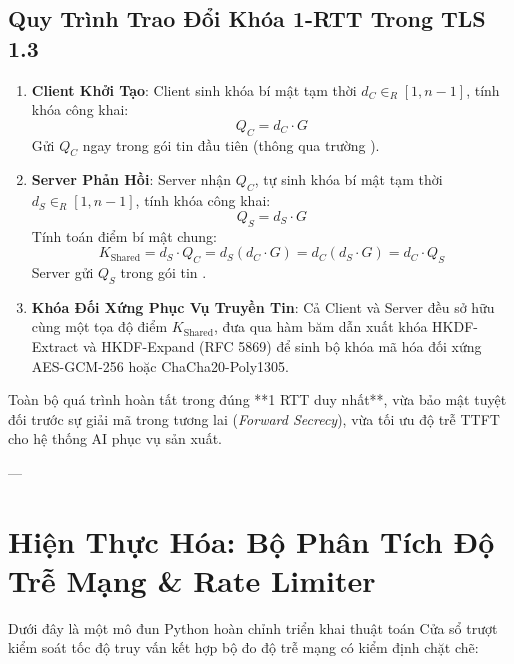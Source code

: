\subsection{Quy Trình Trao Đổi Khóa 1-RTT Trong TLS 1.3}

\begin{enumerate}
  \item \textbf{Client Khởi Tạo}: Client sinh khóa bí mật tạm thời $d_C \in_R [1, n-1]$, tính khóa công khai:
  \begin{equation}
  Q_C = d_C \cdot G
  \end{equation}
  Gửi $Q_C$ ngay trong gói tin đầu tiên  (thông qua trường ).
  \item \textbf{Server Phản Hồi}: Server nhận $Q_C$, tự sinh khóa bí mật tạm thời $d_S \in_R [1, n-1]$, tính khóa công khai:
  \begin{equation}
  Q_S = d_S \cdot G
  \end{equation}
  Tính toán điểm bí mật chung:
  \begin{equation}
  K_{\text{Shared}} = d_S \cdot Q_C = d_S (d_C \cdot G) = d_C (d_S \cdot G) = d_C \cdot Q_S
  \end{equation}
  Server gửi $Q_S$ trong gói tin .
  \item \textbf{Khóa Đối Xứng Phục Vụ Truyền Tin}: Cả Client và Server đều sở hữu cùng một tọa độ điểm $K_{\text{Shared}}$, đưa qua hàm băm dẫn xuất khóa HKDF-Extract và HKDF-Expand (RFC 5869) để sinh bộ khóa mã hóa đối xứng AES-GCM-256 hoặc ChaCha20-Poly1305.
\end{enumerate}

Toàn bộ quá trình hoàn tất trong đúng **1 RTT duy nhất**, vừa bảo mật tuyệt đối trước sự giải mã trong tương lai (\textit{Forward Secrecy}), vừa tối ưu độ trễ TTFT cho hệ thống AI phục vụ sản xuất.

---

\section{Hiện Thực Hóa: Bộ Phân Tích Độ Trễ Mạng \& Rate Limiter}
\label{sec:ch03-implementation}

Dưới đây là một mô đun Python hoàn chỉnh triển khai thuật toán Cửa sổ trượt kiểm soát tốc độ truy vấn kết hợp bộ đo độ trễ mạng có kiểm định chặt chẽ:

